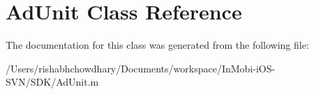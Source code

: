 \hypertarget{class_ad_unit}{
\section{AdUnit Class Reference}
\label{class_ad_unit}
}


The documentation for this class was generated from the following file:\begin{DoxyCompactItemize}
\item 
/Users/rishabhchowdhary/Documents/workspace/InMobi-\/iOS-\/SVN/SDK/AdUnit.m\end{DoxyCompactItemize}
